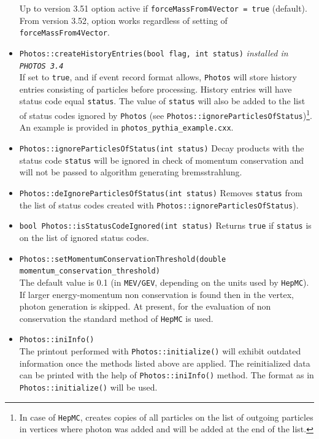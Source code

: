 \documentclass[]{Photos_interface_design}
\begin{document}
\begin{itemize}
        Up to version 3.51 option active if {\tt forceMassFrom4Vector = true} (default).
        From version 3.52, option works regardless of setting of {\tt forceMassFrom4Vector}.
  \item {\tt Photos::createHistoryEntries(bool flag, int status)} {\it  installed in {\tt PHOTOS 3.4}} \\
        If set to {\tt true}, and if event record format allows,
        {\tt Photos} will store history entries consisting of particles
        before processing. History entries will have status code equal {\tt status}.
        The value of {\tt status} will also be added to the list of status
        codes ignored by {\tt Photos} (see {\tt Photos::ignoreParticlesOfStatus})\footnote{In case of {\tt HepMC}, creates copies
        of all particles on the list of outgoing particles in vertices where
        photon was added and will be added at the end of the list.}.
        An example is provided in  {\tt photos\_pythia\_example.cxx}.
  \item {\tt Photos::ignoreParticlesOfStatus(int status)} Decay products with the status code
        {\tt status} will be ignored in check of momentum conservation and will not be passed
        to algorithm generating bremsstrahlung.
  \item {\tt Photos::deIgnoreParticlesOfStatus(int status)} Removes {\tt status} from
        the list of status codes created with {\tt Photos::ignoreParticlesOfStatus}).
  \item {\tt bool Photos::isStatusCodeIgnored(int status)} Returns {\tt true} if {\tt status}
        is on the list of ignored status codes.
  \item {\tt Photos::setMomentumConservationThreshold(double momentum\_{}conservation\_{}threshold)} \\
        The default value is 0.1 (in {\tt MEV/GEV}, depending
on the units used by {\tt HepMC}). If larger energy-momentum non conservation
        is found then in  the vertex, photon generation  is skipped. 
        At present, for the evaluation of non conservation  the standard method of {\tt HepMC}
        is used.
  \item {\tt Photos::iniInfo()} \\
        The printout performed with  {\tt Photos::initialize()}  will exhibit 
        outdated information
        once the methods listed above are applied. The reinitialized data can be printed with 
        the help of  {\tt Photos::iniInfo()} method.
        The format as in {\tt Photos::initialize()}  will be used.
		
\end{itemize}
\end{document}

